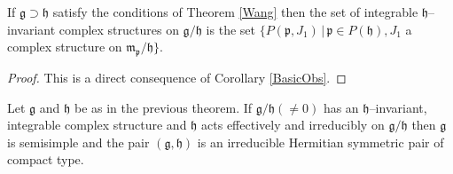 \documentclass{amse-new}
\numberwithin{equation}{section} %
\begin{document}
\begin{theorem}
\label{thm:22} \label{Param2}If $\mathfrak{g}\supset\mathfrak{h}$ satisfy the
conditions of Theorem \ref{Wang} then the set of integrable $\mathfrak{h}
$--invariant complex structures on $\mathfrak{g}/\mathfrak{h}$ is the set
$\{P(\mathfrak{p},J_{1})\, |\, \mathfrak{p}\in P(\mathfrak{h}),J_{1}$ a
complex structure on $\mathfrak{m}_{\mathfrak{p}}/\mathfrak{h}\}$.
\end{theorem}

\begin{proof}
This is a direct consequence of Corollary \ref{BasicObs}.
\end{proof}
\begin{theorem}
\label{LieAlgIrr}
Let $\mathfrak{g}$ and $\mathfrak{h}$ be as in the previous theorem. If
$\mathfrak{g}/\mathfrak{h}(\ne 0)$ has an $\mathfrak{h}$--invariant, integrable
complex structure and $\mathfrak{h}$ acts effectively and irreducibly on $%
\mathfrak{g}/\mathfrak{h}$ then $\mathfrak{g}$ is semisimple and the pair $(%
\mathfrak{g},\mathfrak{h})$ is an irreducible Hermitian symmetric pair of
compact type.
\end{theorem}
\end{document}
